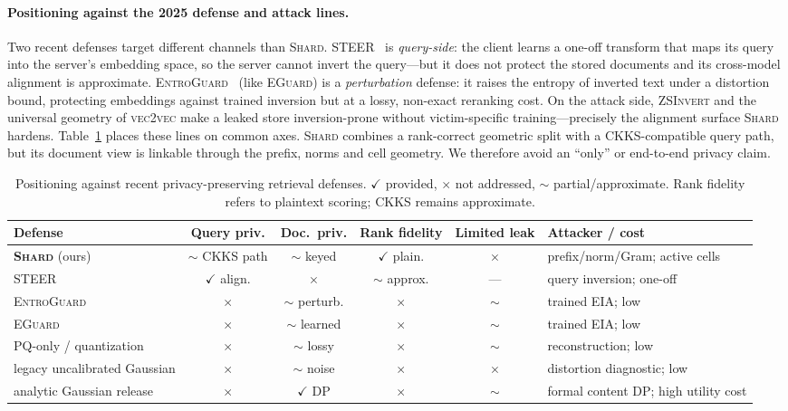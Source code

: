 \documentclass[11pt,a4paper]{article}
\begin{document}
\paragraph{Positioning against the 2025 defense and attack lines.} Two recent
defenses target different channels than \textsc{Shard}.
\textsc{STEER}~\cite{ref_steer} is \emph{query-side}: the client learns a
one-off transform that maps its query into the server's embedding space, so
the server cannot invert the query---but it does not protect the stored
documents and its cross-model alignment is approximate.
\textsc{EntroGuard}~\cite{ref_entroguard} (like \textsc{EGuard}) is a
\emph{perturbation} defense: it raises the entropy of inverted text under a
distortion bound, protecting embeddings against trained inversion but at a
lossy, non-exact reranking cost. On the attack side, \textsc{ZSInvert} and
the universal geometry of \textsc{vec2vec} make a leaked store
inversion-prone without victim-specific training---precisely the alignment
surface \textsc{Shard} hardens. Table~\ref{tab:defense-compare} places these
lines on common axes. \textsc{Shard} combines a rank-correct geometric split
with a CKKS-compatible query path, but its document view is linkable through
the prefix, norms and cell geometry. We therefore avoid an ``only'' or
end-to-end privacy claim.

\begin{table}[tbp]
\centering
\caption{Positioning against recent privacy-preserving retrieval defenses.
$\checkmark$ provided, $\times$ not addressed, $\sim$ partial/approximate.
Rank fidelity refers to plaintext scoring; CKKS remains approximate.}
\label{tab:defense-compare}
\scriptsize
\setlength{\tabcolsep}{2.2pt}
\begin{tabular}{@{}lccccl@{}}
\toprule
Defense & Query priv. & Doc.\ priv. & Rank fidelity & Limited leak & Attacker / cost \\ \midrule
\textbf{\textsc{Shard}} (ours) & $\sim$ CKKS path & $\sim$ keyed & $\checkmark$ plain. & $\times$ & prefix/norm/Gram; active cells \\
\textsc{STEER}~\cite{ref_steer} & $\checkmark$ align. & $\times$ & $\sim$ approx. & --- & query inversion; one-off \\
\textsc{EntroGuard}~\cite{ref_entroguard} & $\times$ & $\sim$ perturb. & $\times$ & $\sim$ & trained EIA; low \\
\textsc{EGuard}~\cite{ref_eguard} & $\times$ & $\sim$ learned & $\times$ & $\sim$ & trained EIA; low \\
PQ-only / quantization & $\times$ & $\sim$ lossy & $\times$ & $\sim$ & reconstruction; low \\
legacy uncalibrated Gaussian & $\times$ & $\sim$ noise & $\times$ & $\times$ & distortion diagnostic; low \\
analytic Gaussian release~\cite{ref_analytic_gaussian} & $\times$ & $\checkmark$ DP & $\times$ & $\sim$ & formal content DP; high utility cost \\
\bottomrule
\end{tabular}
\end{table}
\end{document}
